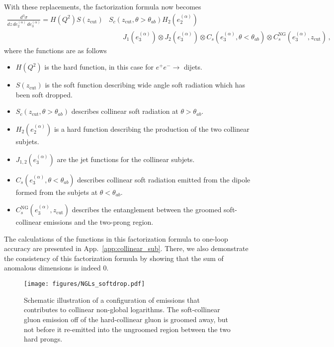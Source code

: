 \documentclass[a4paper,11pt]{article}
\newcommand{\ecf}[2]{e_{#1}^{(#2)}}
\def\zcut{z_{\text{cut}}}
\DeclareRobustCommand{\App}[1]{App.~\ref{#1}}
\begin{document}
With these replacements, the factorization formula now becomes
{\small\begin{align}\label{eq:ninjafact}
\frac{d^3\sigma}{dz\, d\ecf{2}{\alpha}\, d\ecf{3}{\alpha} }= H(Q^2) S(\zcut) &S_c(\zcut,\theta>\theta_{ab}) H_2(\ecf{2}{\alpha})\nonumber\\
&\qquad J_1(\ecf{3}{\alpha})\otimes J_2(\ecf{3}{\alpha})\otimes C_s(\ecf{3}{\alpha},\theta<\theta_{ab}) \otimes C_s^{\text{NG}}(\ecf{3}{\alpha},\zcut)\,,
\end{align}}
where the functions are as follows
 \begin{itemize}
 \item $H(Q^2)$ is the hard function, in this case for $e^+e^-\to$ dijets.
 \item $S(\zcut)$ is the soft function describing wide angle soft radiation which has been soft dropped.
 \item $S_c(\zcut,\theta>\theta_{ab})$ describes collinear soft radiation at $\theta>\theta_{ab}$.
 \item $H_2(\ecf{2}{\alpha})$ is a hard function describing the production of the two collinear subjets.
 \item $J_{1,2}(\ecf{3}{\alpha})$ are the jet functions for the collinear subjets.
 \item $C_s(\ecf{3}{\alpha},\theta<\theta_{ab})$ describes collinear soft radiation emitted from the dipole formed from the subjets at $\theta<\theta_{ab}$.
 \item $C_s^{\text{NG}}(\ecf{3}{\alpha},\zcut)$ describes the entanglement between the groomed soft-collinear emissions and the two-prong region.
 \end{itemize}
%
The calculations of the functions in this factorization formula to one-loop accuracy are presented in \App{app:collinear_sub}.  There, we also demonstrate the consistency of this factorization formula by showing that the sum of anomalous dimensions is indeed 0.



\begin{figure}
\begin{center}
\texttt{[image: figures/NGLs\_softdrop.pdf]}
\end{center}
\caption{
Schematic illustration of a configuration of emissions that contributes to collinear non-global logarithms.  The soft-collinear gluon emission off of the hard-collinear gluon is groomed away, but not before it re-emitted into the ungroomed region between the two hard prongs.
}
\label{fig:collinear_NGLs}
\end{figure}
\end{document}
